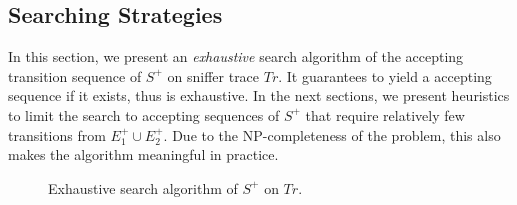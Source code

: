 \subsection{Searching Strategies}
\label{subsec:search}

In this section, we present an \textit{exhaustive} search algorithm of the
accepting transition sequence of $S^+$ on sniffer trace $Tr$. It guarantees to
yield a accepting sequence if it exists, thus is exhaustive.  In the next
sections, we present heuristics to limit the search to accepting sequences of
$S^+$ that require relatively few transitions from $E^+_1 \cup E^+_2$.  Due to
the NP-completeness of the problem, this also makes the algorithm meaningful in
practice.

\begin{figure}[t!]
  \begin{minipage}{\textwidth}
    \begin{algorithm}[H]
      \caption{Exhaustive search algorithm of $S^+$ on $Tr$.}
      \label{alg:search}
      

\end{algorithm}
\end{minipage}
\end{figure}
